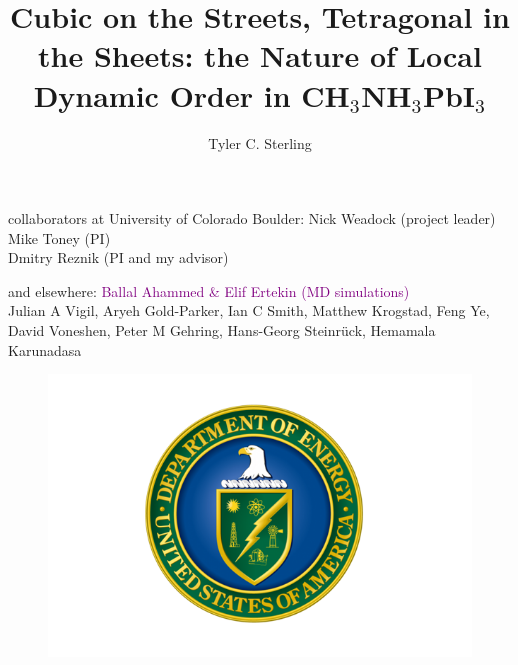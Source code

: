 \documentclass[12pt]{beamer}
\title{Cubic on the Streets, Tetragonal in the Sheets: the Nature of Local Dynamic Order in CH$_3$NH$_3$PbI$_3$}
\author{Tyler C. Sterling}
\date{}
\begin{document}
{


\begin{frame}
\vspace{-1cm}
\titlepage
\end{frame}


\begin{frame} %


\begin{block}{collaborators at University of Colorado Boulder:}
{\color{blue}Nick Weadock (project leader) \\
Mike Toney (PI) \\
Dmitry Reznik (PI and my advisor)}
\end{block}

\vspace{1cm}
\begin{block}{and elsewhere:}
\textcolor{purple}{Ballal Ahammed \& Elif Ertekin (MD simulations)} \\
Julian A Vigil, Aryeh Gold-Parker, Ian C Smith, Matthew Krogstad, Feng Ye, David Voneshen, Peter M Gehring, Hans-Georg Steinrück, Hemamala Karunadasa
\end{block}
\end{frame}


\begin{frame} %

\begin{figure}
    \includegraphics[scale=0.2]{figs/doe_logo.png}
\end{figure}


\end{frame}}
\end{document}
